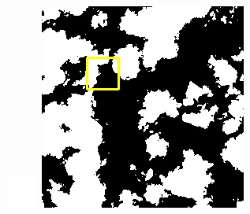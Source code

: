 \documentclass[10pt]{ctexart}
\begin{document}
\begin{figure}[H]
{{\begin{minipage}[b]{0.15\linewidth}
            \includegraphics[width=1\linewidth]{../log/spoon2/cut/tmp_cut_LC81321192014054LGN00_03055_mask.jpg}\vspace{4pt}
            \includegraphics[width=1\linewidth]{../log/spoon2/cut/LC80350192014190LGN00_06561_mask.jpg}\vspace{4pt}

\end{minipage}}}
\end{figure}
\end{document}

